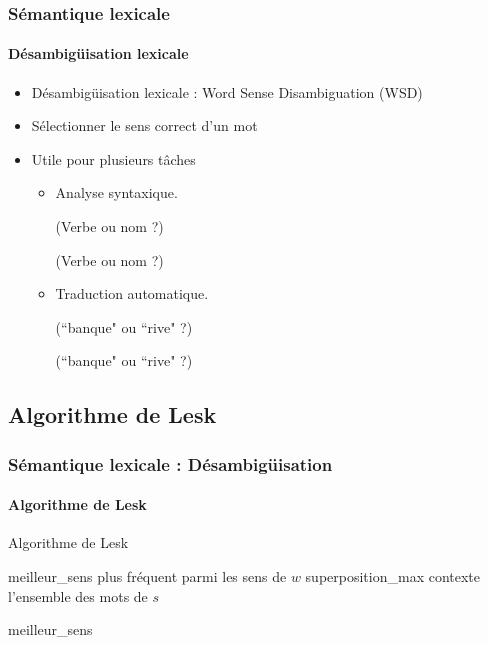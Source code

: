 \documentclass[xcolor=table]{beamer}
\begin{document}
\begin{frame}
\frametitle{Sémantique lexicale}
\framesubtitle{Désambigüisation lexicale}

\begin{itemize}
	\item Désambigüisation lexicale : Word Sense Disambiguation (WSD)
	\item Sélectionner le sens correct d'un mot 
	\item Utile pour plusieurs tâches 
	\begin{itemize}
		\item Analyse syntaxique. 
		
		 (Verbe ou nom ?)
		
		 (Verbe ou nom ?)
		
		\item Traduction automatique. 
		
		 (``banque" ou ``rive" ?)
		
		 (``banque" ou ``rive" ?)
	\end{itemize}
\end{itemize}

\end{frame}

\subsection{Algorithme de Lesk}

\begin{frame}
\frametitle{Sémantique lexicale : Désambigüisation}
\framesubtitle{Algorithme de Lesk}

\vspace{-6pt}
\begin{block}{Algorithme de Lesk}
	\footnotesize\vspace{-3pt}
	\begin{algorithm}[H]
		
		meilleur\_sens \textleftarrow plus fréquent parmi les sens de $w$\;
		superposition\_max \;
		contexte \textleftarrow l'ensemble des mots de $s$\; 
		
		
		\Retour meilleur\_sens \;
		\vspace{-3pt}
	\end{algorithm}
\end{block}

\end{frame}
\end{document}
